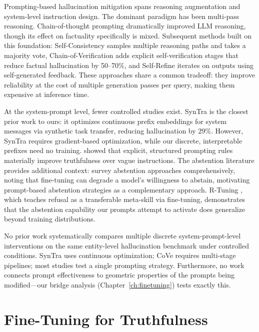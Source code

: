 Prompting-based hallucination mitigation spans reasoning augmentation and system-level instruction design.  The dominant paradigm has been multi-pass reasoning.  Chain-of-thought prompting \citep{wei2022chainofthought} dramatically improved LLM reasoning, though its effect on factuality specifically is mixed.  Subsequent methods built on this foundation: Self-Consistency \citep{wang2023selfconsistency} samples multiple reasoning paths and takes a majority vote, Chain-of-Verification \citep{dhuliawala2023chainofverification} adds explicit self-verification stages that reduce factual hallucination by 50--70\%, and Self-Refine \citep{madaan2023selfrefine} iterates on outputs using self-generated feedback.  These approaches share a common tradeoff: they improve reliability at the cost of multiple generation passes per query, making them expensive at inference time.

At the system-prompt level, fewer controlled studies exist.  SynTra \citep{jones2024teaching} is the closest prior work to ours: it optimizes continuous prefix embeddings for system messages via synthetic task transfer, reducing hallucination by 29\%.  However, SynTra requires gradient-based optimization, while our discrete, interpretable prefixes need no training.  \citet{arora2024structured} showed that explicit, structured prompting rules materially improve truthfulness over vague instructions.  The abstention literature provides additional context: \citet{wen2025know} survey abstention approaches comprehensively, noting that fine-tuning can degrade a model's willingness to abstain, motivating prompt-based abstention strategies as a complementary approach.  R-Tuning \citep{zhang2023rtuning}, which teaches refusal as a transferable meta-skill via fine-tuning, demonstrates that the abstention capability our prompts attempt to activate does generalize beyond training distributions.

No prior work systematically compares multiple discrete system-prompt-level interventions on the same entity-level hallucination benchmark under controlled conditions.  SynTra uses continuous optimization; CoVe requires multi-stage pipelines; most studies test a single prompting strategy.  Furthermore, no work connects prompt effectiveness to geometric properties of the prompts being modified---our bridge analysis (Chapter~\ref{ch:finetuning}) tests exactly this.


\section{Fine-Tuning for Truthfulness}
\label{sec:lit-finetuning}

